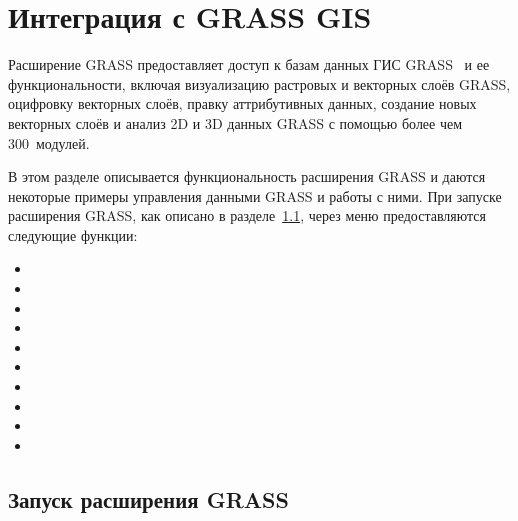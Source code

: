 
\chapter{Интеграция с GRASS GIS}\label{sec:grass}


Расширение GRASS предоставляет доступ к базам данных ГИС GRASS~\cite{GRASSweb}
и ее функциональности, включая визуализацию растровых и векторных слоёв
GRASS, оцифровку векторных слоёв, правку аттрибутивных данных,
создание новых векторных слоёв и анализ 2D и 3D данных GRASS с помощью
более чем 300~модулей.

В этом разделе описывается функциональность расширения GRASS и даются
некоторые примеры управления данными GRASS и работы с ними. При запуске
расширения GRASS, как описано в разделе~\ref{sec:starting_grass},
через меню предоставляются следующие функции:

\begin{itemize}[label=--]
\item {}
\item {}
\item {}
\item {}
\item {}
\item {}
\item {}
\item {}
\item {}
\item {}
\end{itemize}

\section{Запуск расширения GRASS}\label{sec:starting_grass}

